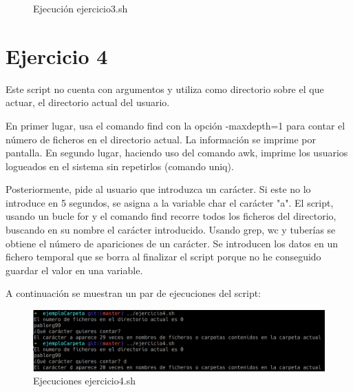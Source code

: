 \documentclass{article}
\begin{document}
\begin{figure}[ht]
    \centering
    \qquad
    \caption{Ejecución ejercicio3.sh}
\end{figure}

\section{Ejercicio 4}
Este script no cuenta con argumentos y utiliza como directorio sobre el que actuar, el directorio actual del usuario.\par
En primer lugar, usa el comando find con la opción -maxdepth=1 para contar el número de ficheros en el directorio actual. La información se imprime por pantalla.
En segundo lugar, haciendo uso del comando awk, imprime los usuarios logueados en el sistema sin repetirlos (comando uniq).\par
Posteriormente, pide al usuario que introduzca un carácter. Si este no lo introduce en 5 segundos, se asigna a la variable char el carácter "a". El script, usando un bucle for y el comando find recorre todos los ficheros del directorio, buscando en su nombre el carácter introducido. Usando grep, wc y tuberías se obtiene el número de apariciones de un carácter. Se introducen los datos en un fichero temporal que se borra al finalizar el script porque no he conseguido guardar el valor en una variable.\par
A continuación se muestran un par de ejecuciones del script:

\begin{figure}[ht]
    \centering
    \includegraphics[width=1\textwidth]{ejercicio4.png}
    \caption{Ejecuciones ejercicio4.sh}
\end{figure}
\end{document}
